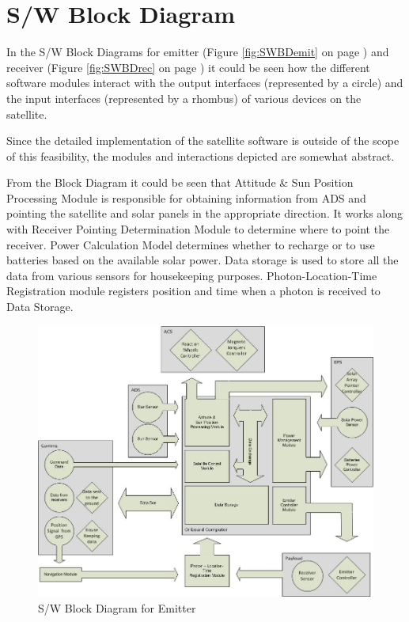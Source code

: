 \section{S/W Block Diagram}
\label{section_SWBD}

In the S/W Block Diagrams for emitter (Figure \ref{fig:SWBDemit} on page \pageref{fig:SWBDemit}) and receiver (Figure \ref{fig:SWBDrec} on page \pageref{SWBDrec})  it could be seen how the different software modules interact with the output interfaces (represented by a circle) and the input interfaces (represented by a rhombus) of various devices on the satellite. 
 
Since the detailed implementation of the satellite software is outside of the scope of this feasibility, the modules and interactions depicted are somewhat abstract.  

From the Block Diagram it could be seen that Attitude \& Sun Position Processing Module is responsible for obtaining information from \ac{ADS} and pointing the satellite and solar panels in the appropriate direction. It works along with Receiver Pointing Determination Module to determine where to point the receiver. Power Calculation Model determines whether to recharge or to use batteries based on the available solar power. Data storage is used to store all the data from various sensors for housekeeping purposes. Photon-Location-Time Registration module registers position and time when a photon is received to Data Storage.

\begin{landscape}
\begin{figure}[ht!]
\centering
\includegraphics[width=1.3\textheight]{chapters/img/SWBDemit.jpg}
\caption{S/W Block Diagram for Emitter }
\label{SWBDemit}
\end{figure}
\end{landscape}


